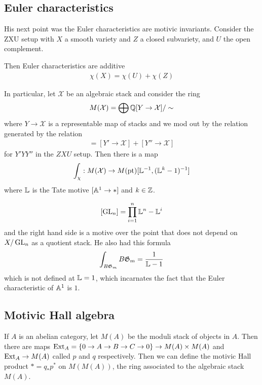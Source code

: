 \documentclass[12pt]{article}
\begin{document}
\subsection{Euler characteristics}
His next point was the Euler characteristics are motivic invariants.
Consider the ZXU setup with \( X \) a smooth variety and 
\( Z \) a closed subvariety, and \( U \) the open complement.

Then Euler characteristics are additive \begin{align*}
    \chi(X) = \chi(U) + \chi(Z)
\end{align*}

In particular, let $\mathcal{X}$ be an algebraic stack and consider the ring \begin{align*}
    M(\mathcal{X}) = \bigoplus \mathbb{Q} [Y\to \mathcal{X}]/\sim
\end{align*} where $Y\to \mathcal{X}$ is a representable map of stacks and 
we mod out by the relation generated by the relation \begin{align*}
    [Y\to \mathcal{X}] = [Y'\to \mathcal{X}] + [Y''\to \mathcal{X}]
\end{align*} for $Y'YY''$ in the $ZXU$ setup. Then there is a map \begin{align*}
    \int_\chi : M(\mathcal{X}) \to M(\text{pt})[\mathbb{L}^{-1},(\mathbb{L}^k-1)^{-1}]
\end{align*} where $\mathbb{L}$ is the Tate motive $[\mathbb{A}^1\to *]$ and $k\in\mathbb{Z}$.
\begin{example}
    \[[\operatorname{GL}_n] = \prod_{i=1}^n \mathbb{L}^n - \mathbb{L}^i\] 
    and the right hand side is a motive over the point that does not depend on $X/\operatorname{GL}_n$ 
    as a quotient stack. He also had this formula \begin{align*}
        \int_{B\mathfrak{G}_m} B\mathfrak{G}_m = \frac{1}{\mathbb{L} - 1}
    \end{align*} which is not defined at $\mathbb{L} = 1$, which incarnates the fact that 
    the Euler characteristic of $\mathbb{A}^1$ is $1$.
\end{example}
\subsection{Motivic Hall algebra}
If $A$ is an abelian category, let $M(A)$ be the moduli stack of objects in $A$.
Then there are maps $\operatorname{Ext}_A = \{0\to A \to B \to C \to 0\} \to M(A) \times M(A)$
and $\operatorname{Ext}_A \to M(A)$ called $p$ and $q$ respectively. Then we can define the
motivic Hall product $* = q_*p^*$ on $M(M(A))$, the ring associated 
to the algebraic stack $M(A)$.
\end{document}
